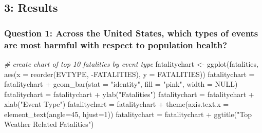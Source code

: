 \documentclass[
]{article}
\newenvironment{Shaded}{\begin{snugshade}}{\end{snugshade}}
\newcommand{\AttributeTok}[1]{\textcolor[rgb]{0.77,0.63,0.00}{#1}}
\newcommand{\CommentTok}[1]{\textcolor[rgb]{0.56,0.35,0.01}{\textit{#1}}}
\newcommand{\ConstantTok}[1]{\textcolor[rgb]{0.00,0.00,0.00}{#1}}
\newcommand{\DecValTok}[1]{\textcolor[rgb]{0.00,0.00,0.81}{#1}}
\newcommand{\FunctionTok}[1]{\textcolor[rgb]{0.00,0.00,0.00}{#1}}
\newcommand{\NormalTok}[1]{#1}
\newcommand{\OtherTok}[1]{\textcolor[rgb]{0.56,0.35,0.01}{#1}}
\newcommand{\SpecialCharTok}[1]{\textcolor[rgb]{0.00,0.00,0.00}{#1}}
\newcommand{\StringTok}[1]{\textcolor[rgb]{0.31,0.60,0.02}{#1}}
\begin{document}
\hypertarget{results}{%
\subsection{3: Results}\label{results}}

\hypertarget{question-1-across-the-united-states-which-types-of-events-are-most-harmful-with-respect-to-population-health}{%
\subsubsection{Question 1: Across the United States, which types of
events are most harmful with respect to population
health?}\label{question-1-across-the-united-states-which-types-of-events-are-most-harmful-with-respect-to-population-health}}

\begin{Shaded}
\begin{Highlighting}[]
\CommentTok{\# create chart of top 10 fatalities by event type}
\NormalTok{fatalitychart }\OtherTok{\textless{}{-}} \FunctionTok{ggplot}\NormalTok{(fatalities, }\FunctionTok{aes}\NormalTok{(}\AttributeTok{x =} \FunctionTok{reorder}\NormalTok{(EVTYPE, }\SpecialCharTok{{-}}\NormalTok{FATALITIES), }\AttributeTok{y =}\NormalTok{ FATALITIES)) }
\NormalTok{fatalitychart }\OtherTok{=}\NormalTok{ fatalitychart }\SpecialCharTok{+} \FunctionTok{geom\_bar}\NormalTok{(}\AttributeTok{stat =} \StringTok{"identity"}\NormalTok{, }\AttributeTok{fill =} \StringTok{"pink"}\NormalTok{, }\AttributeTok{width =} \ConstantTok{NULL}\NormalTok{)}
\NormalTok{fatalitychart }\OtherTok{=}\NormalTok{ fatalitychart }\SpecialCharTok{+} \FunctionTok{ylab}\NormalTok{(}\StringTok{"Fatalities"}\NormalTok{) }
\NormalTok{fatalitychart }\OtherTok{=}\NormalTok{ fatalitychart }\SpecialCharTok{+} \FunctionTok{xlab}\NormalTok{(}\StringTok{"Event Type"}\NormalTok{) }
\NormalTok{fatalitychart }\OtherTok{=}\NormalTok{ fatalitychart }\SpecialCharTok{+} \FunctionTok{theme}\NormalTok{(}\AttributeTok{axis.text.x =} \FunctionTok{element\_text}\NormalTok{(}\AttributeTok{angle=}\DecValTok{45}\NormalTok{, }\AttributeTok{hjust=}\DecValTok{1}\NormalTok{))}
\NormalTok{fatalitychart }\OtherTok{=}\NormalTok{ fatalitychart }\SpecialCharTok{+} \FunctionTok{ggtitle}\NormalTok{(}\StringTok{"Top Weather Related Fatalities"}\NormalTok{)}



\end{Highlighting}
\end{Shaded}
\end{document}

